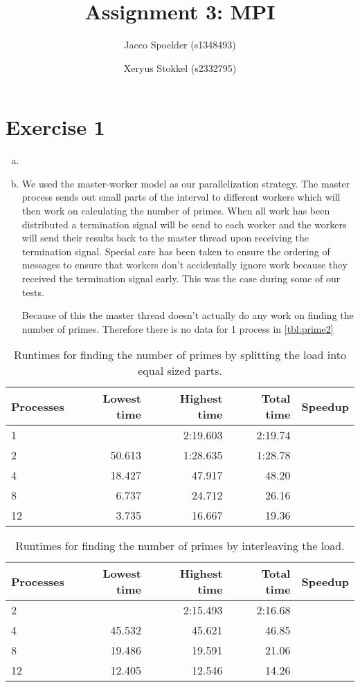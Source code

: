 \documentclass[a4paper]{article}
\title{Assignment 3: MPI}
\author{Jacco Spoelder (s1348493) \and Xeryus Stokkel (s2332795)}
\begin{document}
\maketitle

\section{Exercise 1}
\begin{enumerate}[(a)]
	\item 
	\item We used the master-worker model as our parallelization strategy. The master process sends out small parts of the interval to different workers which will then work on calculating the number of primes. When all work has been distributed a termination signal will be send to each worker and the workers will send their results back to the master thread upon receiving the termination signal. Special care has been taken to ensure the ordering of messages to ensure that workers don't accidentally ignore work because they received the termination signal early. This was the case during some of our tests.
	
	Because of this the master thread doesn't actually do any work on finding the number of primes. Therefore there is no data for 1 process in \autoref{tbl:prime2}
\end{enumerate}

\begin{table}[h]
	\centering
	\caption{Runtimes for finding the number of primes by splitting the load into equal sized parts.}
	\label{tbl:prime}
	\begin{tabular}{l|r|r|r|r}
		Processes & Lowest time & Highest time & Total time & Speedup \\ \hline
		 1 &  & 2:19.603 & 2:19.74 &  \\
		 2 & 50.613 & 1:28.635 & 1:28.78 &  \\
		 4 & 18.427 & 47.917 & 48.20 &  \\
		 8 &  6.737 & 24.712 & 26.16 &  \\
		12 &  3.735 & 16.667 & 19.36 &  \\
	\end{tabular}
\end{table}

\begin{table}[h]
	\centering
	\caption{Runtimes for finding the number of primes by interleaving the load.}
	\label{tbl:prime2}
	\begin{tabular}{l|r|r|r|r}
		Processes & Lowest time & Highest time & Total time & Speedup \\ \hline
		 2 &    & 2:15.493 & 2:16.68 &  \\
	 	 4 & 45.532 & 45.621 & 46.85 &  \\
	 	 8 & 19.486 & 19.591 & 21.06 &  \\
		12 & 12.405 & 12.546 & 14.26 &  \\
	\end{tabular}
\end{table}
\end{document}
